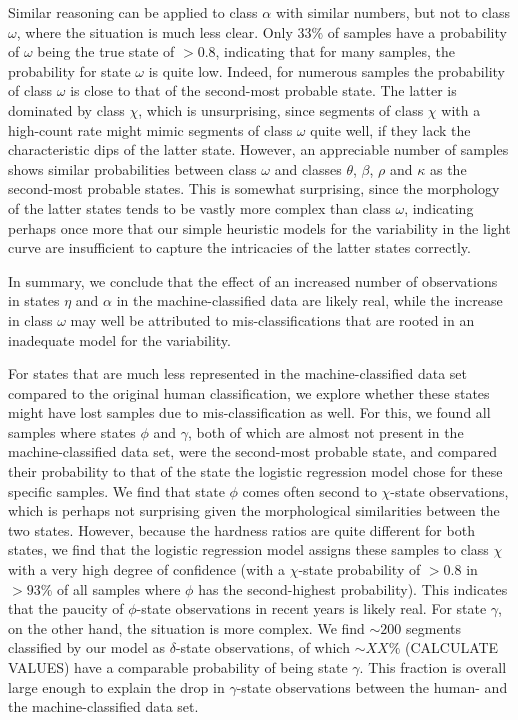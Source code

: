 \documentclass[12pt]{emulateapj}
\begin{document}
Similar reasoning can be applied to class $\alpha$ with similar numbers, but not to class $\omega$, where the situation is much less clear.
Only $33\%$ of samples have a probability of $\omega$ being the true state of $>0.8$, indicating that for many samples, the probability for state $\omega$ is quite low. Indeed, for numerous samples the probability of class $\omega$ is close to that of the second-most probable state. The latter is dominated by class $\chi$, which is unsurprising, since segments of class $\chi$ with a high-count rate might mimic segments of class $\omega$ quite well, if they lack the characteristic dips of the latter state. However, an appreciable number of samples shows similar probabilities between class $\omega$ and classes $\theta$, $\beta$, $\rho$ and $\kappa$ as the second-most probable states. This is somewhat surprising, since the morphology of the latter states tends to be vastly more complex than class $\omega$, indicating perhaps once more that our simple heuristic models for the variability in the light curve are insufficient to capture the intricacies of the latter states correctly.

In summary, we conclude that the effect of an increased number of observations in states $\eta$ and $\alpha$ in the machine-classified data are likely real, while the increase in class $\omega$ may well be attributed to mis-classifications that are rooted in an inadequate model for the variability.

For states that are much less represented in the machine-classified data set compared to the original human classification, we explore whether these states might have lost samples due to mis-classification as well. For this, we found all samples where states $\phi$ and $\gamma$, both of which are almost not present in the 
machine-classified data set, were the second-most probable state, and compared their probability to that of the state the logistic regression model chose for these specific samples. We find that state $\phi$ comes often second to $\chi$-state observations, which is perhaps not surprising given the morphological similarities between the two states. However, because the hardness ratios are quite different for both states, we find that the logistic regression model assigns these samples to class $\chi$ with a very high degree of confidence (with a $\chi$-state probability of $>0.8$ in $>93\%$ of all samples where $\phi$ has the second-highest probability). This indicates that the paucity of $\phi$-state observations in recent years is likely real. 
For state $\gamma$, on the other hand, the situation is more complex. We find $\sim 200$ segments classified by our model as $\delta$-state observations, of which $\sim XX\%$ (CALCULATE VALUES) have a comparable probability of being state $\gamma$. This fraction is overall large enough to explain the drop in $\gamma$-state observations between the human- and the machine-classified data set.
\end{document}

